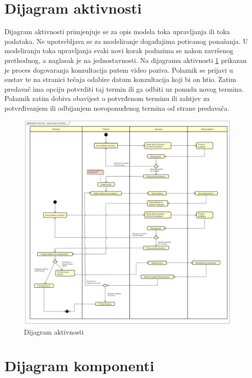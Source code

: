 		
			\eject 
		
		\section{Dijagram aktivnosti}
			
			\text Dijagram aktivnosti primjenjuje se za opis modela toka upravljanja ili toka podataka. Ne upotrebljava se za modeliranje događajima poticanog ponašanja. U modeliranju toka upravljanja svaki novi korak poduzima se nakon završenog prethodnog, a naglasak je na jednostavnosti. Na dijagramu aktivnosti \ref{fig:Dijagram_aktivnosti} prikazan je proces dogovaranja konzultacija putem video poziva. Polaznik se prijavi u sustav te na stranici tečaja odabire datum konzultacija koji bi on htio. Zatim predavač ima opciju potvrditi taj termin ili ga odbiti uz ponudu novog termina. Polaznik zatim dobiva obavijest o potvrđenom terminu ili zahtjev za potvrđivanjem ili odbijanjem novoponuđenog termina od strane predavača.
			\eject
			
			\begin{figure}[h]
				\includegraphics[scale=0.35]{dijagrami/Dijagram_aktivnosti.PNG}
				\centering
				\caption{Dijagram aktivnosti}
				\label{fig:Dijagram_aktivnosti}
			\end{figure}
		\eject
			
		\section{Dijagram komponenti}
		
